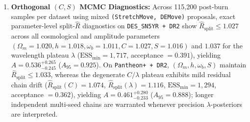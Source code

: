 \documentclass[10pt,twocolumn,a4paper]{article}
\begin{document}
\begin{enumerate}
\item \textbf{Orthogonal $(C, S)$ MCMC Diagnostics:} Across 115,200 post-burn samples per dataset using mixed \texttt{(StretchMove, DEMove)} proposals, exact parameter-level split-$\hat{R}$ diagnostics on \texttt{DES\_SN5YR + DR2} show $\hat{R}_{\mathrm{split}} \le 1.027$ across all cosmological and amplitude parameters $(\Omega_m=1.020, h=1.018, \omega_b=1.011, C=1.027, S=1.016)$ and $1.037$ for the wavelength plateau $\lambda$ ($\mathrm{ESS}_{\min} = 1,717$, acceptance $= 0.391$), yielding $A = 0.536^{+0.265}_{-0.245}$ ($A_{95} = 0.925$). On \texttt{Pantheon+ + DR2}, $(\Omega_m, h, \omega_b, S)$ maintain $\hat{R}_{\mathrm{split}} \le 1.033$, whereas the degenerate $C/\lambda$ plateau exhibits mild residual chain drift ($\hat{R}_{\mathrm{split}}(C)=1.074$, $\hat{R}_{\mathrm{split}}(\lambda)=1.116$, $\mathrm{ESS}_{\min} = 1,294$, acceptance $= 0.362$), yielding $A = 0.461^{+0.280}_{-0.233}$ ($A_{95} = 0.888$); longer independent multi-seed chains are warranted whenever precision $\lambda$-posteriors are interpreted.
\end{enumerate}
\end{document}
